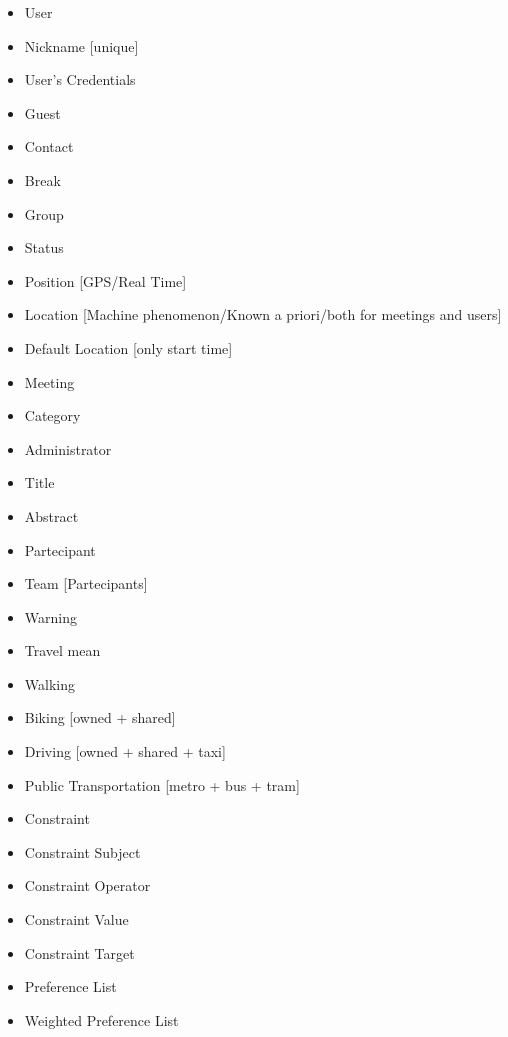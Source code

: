 \begin{itemize}
\item User
\item Nickname [unique]
\item User’s Credentials
\item Guest
\item Contact
\item Break
\item Group
\item Status

\item Position [GPS/Real Time]
\item Location [Machine phenomenon/Known a priori/both for meetings and users]
\item Default Location [only start time]

\item Meeting
\item Category
\item Administrator
\item Title
\item Abstract
\item Partecipant
\item Team [Partecipants]

\item Warning

\item Travel mean
\item Walking
\item Biking [owned + shared]
\item Driving [owned + shared + taxi]
\item Public Transportation [metro + bus + tram]

\item Constraint
\item Constraint Subject
\item Constraint Operator
\item Constraint Value
\item Constraint Target

\item Preference List
\item Weighted Preference List
\end{itemize}